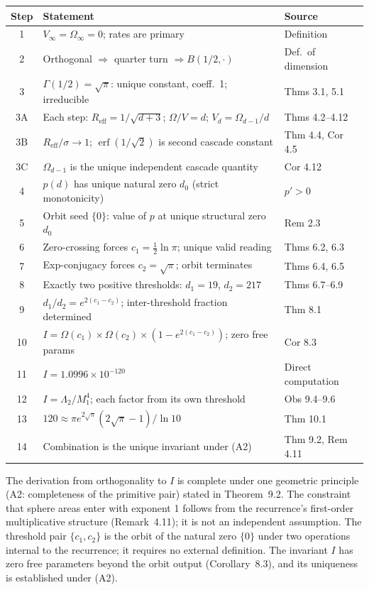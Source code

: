 \documentclass[11pt,a4paper]{article}
\begin{document}
\begin{center}
\begin{tabular}{cll}
\toprule
Step & Statement & Source\\
\midrule
1 & $V_\infty = \Omega_\infty = 0$; rates are primary & Definition\\
2 & Orthogonal $\Rightarrow$ quarter turn $\Rightarrow B(1/2,\cdot)$ & Def.\ of dimension\\
3 & $\Gamma(1/2) = \sqrt{\pi}$: unique constant, coeff.\ 1; irreducible & Thms 3.1, 5.1\\
3A & Each step: $R_{\mathrm{eff}} = 1/\sqrt{d+3}$; $\Omega/V = d$; $V_d = \Omega_{d-1}/d$ & Thms 4.2--4.12\\
3B & $R_{\mathrm{eff}}/\sigma\to 1$; $\operatorname{erf}(1/\sqrt{2})$ is second cascade constant & Thm 4.4, Cor 4.5\\
3C & $\Omega_{d-1}$ is the unique independent cascade quantity & Cor 4.12\\
4 & $p(d)$ has unique natural zero $d_0$ (strict monotonicity) & $p'>0$\\
5 & Orbit seed $\{0\}$: value of $p$ at unique structural zero $d_0$ & Rem 2.3\\
6 & Zero-crossing forces $c_1 = \tfrac{1}{2}\ln\pi$; unique valid reading & Thms 6.2, 6.3\\
7 & Exp-conjugacy forces $c_2 = \sqrt{\pi}$; orbit terminates & Thms 6.4, 6.5\\
8 & Exactly two positive thresholds: $d_1 = 19$, $d_2 = 217$ & Thms 6.7--6.9\\
9 & $d_1/d_2 = e^{2(c_1-c_2)}$; inter-threshold fraction determined & Thm 8.1\\
10 & $I = \Omega(c_1)\times\Omega(c_2)\times(1-e^{2(c_1-c_2)})$; zero free params & Cor 8.3\\
11 & $I = 1.0996\times 10^{-120}$ & Direct computation\\
12 & $I = \Lambda_2/M_1^4$; each factor from its own threshold & Obs 9.4--9.6\\
13 & $120\approx\pi e^{2\sqrt{\pi}}(2\sqrt{\pi}-1)/\ln 10$ & Thm 10.1\\
14 & Combination is the unique invariant under (A2) & Thm 9.2, Rem 4.11\\
\bottomrule
\end{tabular}
\end{center}

The derivation from orthogonality to $I$ is complete under one geometric principle (A2: completeness of the primitive pair) stated in Theorem~9.2. The constraint that sphere areas enter with exponent 1 follows from the recurrence's first-order multiplicative structure (Remark~4.11); it is not an independent assumption. The threshold pair $\{c_1, c_2\}$ is the orbit of the natural zero $\{0\}$ under two operations internal to the recurrence; it requires no external definition. The invariant $I$ has zero free parameters beyond the orbit output (Corollary~8.3), and its uniqueness is established under (A2).
\end{document}
